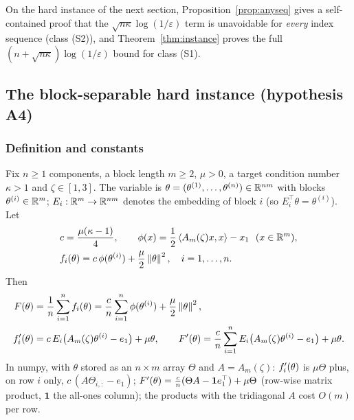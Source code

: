 On the hard instance of the next section, Proposition~\ref{prop:anyseq} gives a self-contained proof that the $\sqrt{n\kappa}\log(1/\varepsilon)$ term is unavoidable for \emph{every} index sequence (class (S2)), and Theorem~\ref{thm:instance} proves the full $(n+\sqrt{n\kappa})\log(1/\varepsilon)$ bound for class (S1).
\subsection{The block-separable hard instance (hypothesis A4)}
\label{sec:lb:instance}

\subsubsection{Definition and constants}

Fix $n\ge1$ components, a block length $m\ge2$, $\mu>0$, a target condition number $\kappa>1$ and $\zeta\in[1,3]$. The variable is $\theta=(\theta^{(1)},\dots,\theta^{(n)})\in\mathbb{R}^{nm}$ with blocks $\theta^{(i)}\in\mathbb{R}^m$; $E_i:\mathbb{R}^m\to\mathbb{R}^{nm}$ denotes the embedding of block $i$ (so $E_i^\top\theta=\theta^{(i)}$). Let
\begin{equation}
\label{eq:instance}
\begin{aligned}
&c=\frac{\mu(\kappa-1)}{4},\qquad \phi(x)=\frac12\left\langle A_m(\zeta)x, x \right\rangle-x_1\ \ (x\in\mathbb{R}^m),\\
&f_i(\theta)=c\,\phi(\theta^{(i)})+\frac\mu2\left\|\theta\right\|^2,\quad i=1,\dots,n .
\end{aligned}
\end{equation}
Then
\begin{equation}
\label{eq:instanceF}
\begin{aligned}
F(\theta)&=\frac1n\sum_{i=1}^nf_i(\theta)=\frac cn\sum_{i=1}^n\phi(\theta^{(i)})+\frac\mu2\left\|\theta\right\|^2,\\
f'_i(\theta)&=c\,E_i\big(A_m(\zeta)\theta^{(i)}-e_1\big)+\mu\theta,\qquad
F'(\theta)=\frac cn\sum_{i=1}^nE_i\big(A_m(\zeta)\theta^{(i)}-e_1\big)+\mu\theta .
\end{aligned}
\end{equation}
In numpy, with $\theta$ stored as an $n\times m$ array $\Theta$ and $A=A_m(\zeta)$: $f'_i(\theta)$ is $\mu\Theta$ plus, on row $i$ only, $c\,(A\Theta_{i,:}-e_1)$; $F'(\theta)=\frac cn(\Theta A-\mathbf 1e_1^\top)+\mu\Theta$ (row-wise matrix product, $\mathbf 1$ the all-ones column); the products with the tridiagonal $A$ cost $O(m)$ per row.


